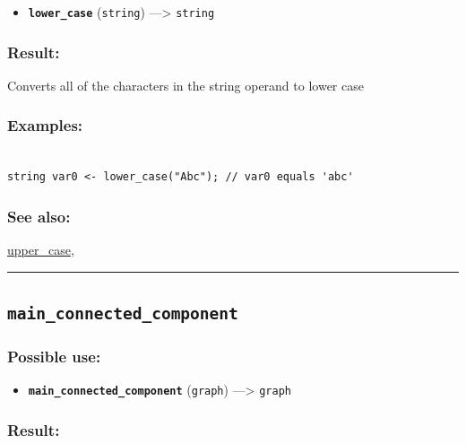 \documentclass[]{book}
\providecommand{\tightlist}{%
  \setlength{\itemsep}{0pt}\setlength{\parskip}{0pt}}
\theoremstyle{definition}
\theoremstyle{definition}
\theoremstyle{definition}
\theoremstyle{remark}
\begin{document}
\begin{itemize}
\tightlist
\item
  \textbf{\texttt{lower\_case}} (\texttt{string}) ---\textgreater{}
  \texttt{string}
\end{itemize}

\subsubsection{Result:}\label{result-321}

Converts all of the characters in the string operand to lower case

\subsubsection{Examples:}\label{examples-229}

\begin{verbatim}
 
string var0 <- lower_case("Abc"); // var0 equals 'abc'
\end{verbatim}

\subsubsection{See also:}\label{see-also-130}

\href{operators-s-to-z.html\#upper_case}{upper\_case},

\begin{center}\rule{0.5\linewidth}{\linethickness}\end{center}

\subsection{\texorpdfstring{\texttt{main\_connected\_component}}{main\_connected\_component}}\label{main_connected_component}

\subsubsection{Possible use:}\label{possible-use-332}

\begin{itemize}
\tightlist
\item
  \textbf{\texttt{main\_connected\_component}} (\texttt{graph})
  ---\textgreater{} \texttt{graph}
\end{itemize}

\subsubsection{Result:}\label{result-322}
\end{document}
